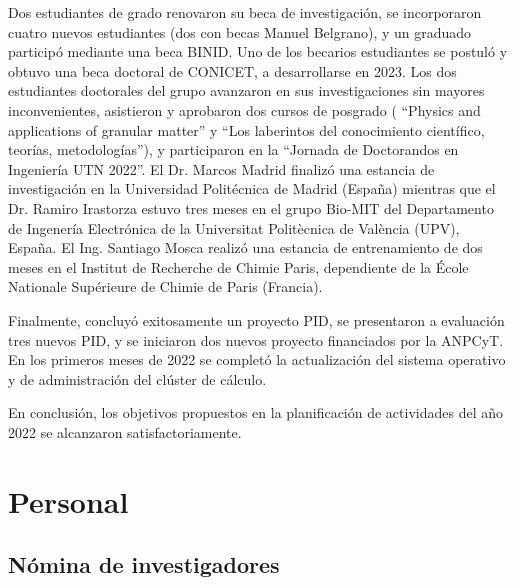 \documentclass[a4paper,11pt,twoside,final,titlepage,onecolumn,openright]{report}
\begin{document}
Dos estudiantes de grado renovaron su beca de investigación, se incorporaron cuatro nuevos estudiantes (dos con becas Manuel Belgrano), y un graduado participó mediante una beca BINID. Uno de los becarios estudiantes se postuló y obtuvo una beca doctoral de CONICET, a desarrollarse en 2023. Los dos estudiantes doctorales del grupo avanzaron en sus investigaciones sin mayores inconvenientes, asistieron y aprobaron dos cursos de posgrado ( ``Physics and applications of granular matter'' y ``Los laberintos del conocimiento científico, teorías, metodologías''), y participaron en la ``Jornada de Doctorandos en Ingeniería UTN 2022''.  El Dr. Marcos Madrid finalizó una estancia de investigación en la Universidad Politécnica de Madrid (España) mientras que el Dr. Ramiro Irastorza estuvo tres meses en el grupo Bio-MIT del Departamento de Ingenería Electrónica de la Universitat Politècnica de València (UPV), España. El Ing. Santiago Mosca realizó una estancia de entrenamiento de dos meses en el Institut de Recherche de Chimie Paris, dependiente de la École Nationale Supérieure de Chimie de Paris (Francia).

Finalmente, concluyó exitosamente un proyecto PID, se presentaron a evaluación tres nuevos PID,  y se iniciaron dos nuevos proyecto financiados por la ANPCyT. En los primeros meses de 2022 se completó la actualización del sistema operativo y de administración del clúster de cálculo.

En conclusión, los objetivos propuestos en la planificación de actividades del año 2022 se alcanzaron satisfactoriamente.

\section{Personal}

\subsection{Nómina de investigadores}
\end{document}
